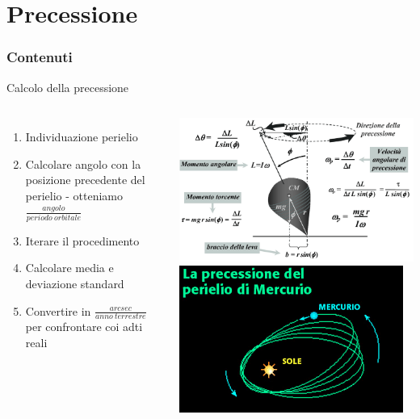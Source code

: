 \section{Precessione}
    \begin{frame}
        \frametitle{Contenuti}
        \transblindsvertical
        \tableofcontents[currentsection]
    \end{frame}
    
    \begin{frame}{Calcolo della precessione}
        \begin{columns}
                \begin{enumerate}
                    \item Individuazione perielio
                    \item Calcolare angolo con la posizione precedente del perielio - otteniamo $\frac{angolo}{periodo\ orbitale}$
                    \item Iterare il procedimento
                    \item Calcolare media e deviazione standard
                    \item Convertire in $\frac{arcsec}{anno\ terrestre}$ per confrontare coi adti reali
                \end{enumerate}
                \centering
                \includegraphics[width=.9\textwidth]{9_prec/precessione.png} \\
                \vspace{3mm}
                \includegraphics[width=.9\textwidth]{9_prec/mercurio.png}
        \end{columns}
    \end{frame}

